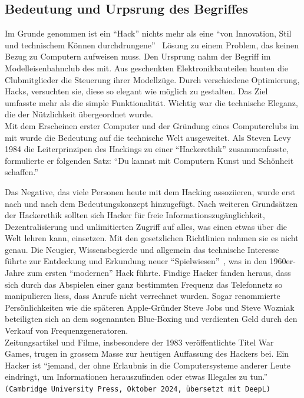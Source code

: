 \documentclass[11pt, a4paper]{article}
\begin{document}
\subsection{Bedeutung und Urpsrung des Begriffes}
Im Grunde genommen ist ein ``Hack'' nichts mehr als eine ``von Innovation, Stil und technischem Können durchdrungene''~\cite{bpbKleineGeschichte:online} Lösung zu einem Problem, das keinen Bezug zu Computern aufweisen muss. Den Ursprung nahm der Begriff im Modelleisenbahnclub des \gls{mit}. Aus geschenkten Elektronikbauteilen bauten die Clubmitglieder die Steuerung ihrer Modellzüge. Durch verschiedene Optimierung, Hacks, versuchten sie, diese so elegant wie möglich zu gestalten. Das Ziel umfasste mehr als die simple Funktionalität. Wichtig war die technische Eleganz, die der Nützlichkeit übergeordnet wurde. \\Mit dem Erscheinen erster Computer und der Gründung eines Computerclubs im \gls{mit} wurde die Bedeutung auf die technische Welt ausgeweitet. Als Steven Levy 1984 die Leiterprinzipen des Hackings zu einer ``Hackerethik'' zusammenfasste, formulierte er folgenden Satz: ``Du kannst mit Computern Kunst und Schönheit schaffen.''~\cite{bpbKleineGeschichte:online}

Das Negative, das viele Personen heute mit dem Hacking assoziieren, wurde erst nach und nach dem Bedeutungskonzept hinzugefügt. Nach weiteren Grundsätzen der Hackerethik sollten sich Hacker für freie Informationszugänglichkeit, Dezentralisierung und unlimitierten Zugriff auf alles, was einen etwas über die Welt lehren kann, einsetzen. Mit den gesetzlichen Richtlinien nahmen sie es nicht genau. Die Neugier, Wissensbegierde und allgemein das technische Interesse führte zur Entdeckung und Erkundung neuer ``Spielwiesen''~\cite{bpbKleineGeschichte:online}, was in den 1960er-Jahre zum ersten ``modernen'' Hack führte. Findige Hacker fanden heraus, dass sich durch das Abspielen einer ganz bestimmten Frequenz das Telefonnetz so manipulieren liess, dass Anrufe nicht verrechnet wurden. Sogar renommierte Persönlichkeiten wie die späteren Apple-Gründer Steve Jobs und Steve Wozniak beteiligten sich an dem sogenannten Blue-Boxing und verdienten Geld durch den Verkauf von Frequenzgeneratoren. \\Zeitungsartikel und Filme, insbesondere der 1983 veröffentlichte Titel War Games, trugen in grossem Masse zur heutigen Auffassung des Hackers bei.  Ein Hacker ist ``jemand, der ohne Erlaubnis in die Computersysteme anderer Leute eindringt, um Informationen herauszufinden oder etwas Illegales zu tun.'' \texttt{(Cambridge University Press, Oktober 2024, übersetzt mit DeepL)} \cite{bpbKleineGeschichte:online, CambridgeHacker:online}
\end{document}
